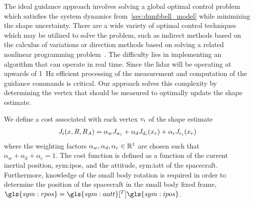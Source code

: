 

The ideal guidance approach involves solving a global optimal control problem which satisfies the system dynamics from~\cref{sec:dumbbell_model} while minimizing the shape uncertainty.
There are a wide variety of optimal control techniques which may be utilized to solve the problem, such as indirect methods based on the calculus of variations or direction methods based on solving a related nonlinear programming problem~\cite{kirk2012,bryson1975}.
The difficulty lies in implementing an algorithm that can operate in real time.
Since the \gls{lidar} will be operating at upwards of \SI{1}{\hertz} efficient processing of the measurement and computation of the guidance commands is critical.
Our approach solves this complexity by determining the vertex that should be measured to optimally update the shape estimate.

We define a cost associated with each vertex \( v_i \) of the shape estimate
\begin{align}\label{eq:explore_cost}
    J_i (x, R, R_A) = \alpha_w J_{w_i} + \alpha_d J_{d_i}(x_r) + \alpha_c J_{c_i}(x_r)
\end{align}
where the weighting factors \( \alpha_w, \alpha_d, \alpha_c \in \mathbb{R}^1 \) are chosen such that \( \alpha_w + \alpha_d + \alpha_c = 1 \).
The cost function is defined as a function of the current inertial position, \gls{sym:ipos}, and the attitude, \gls{sym:iatt} of the spacecraft.
Furthermore, knowledge of the small body rotation is required in order to determine the position of the spacecraft in the small body fixed frame, \( \gls{sym:rpos} = \gls{sym:aatt}[^T] \gls{sym:ipos}\).

